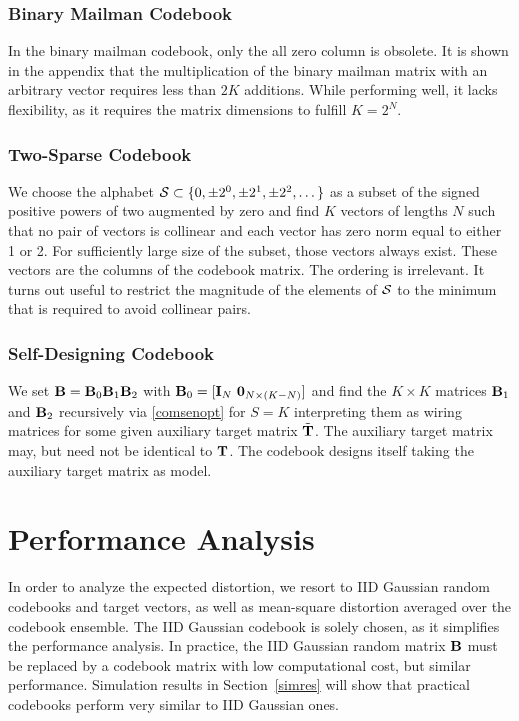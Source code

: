 \documentclass[twocolumn]{IEEEtran}
\begin{document}
\subsubsection{Binary Mailman Codebook}
In the binary mailman codebook, only the all zero column is obsolete. It is shown in the appendix that the multiplication of the binary mailman matrix with an arbitrary vector requires less than $2K$ additions. While performing well, it lacks flexibility, as it requires the matrix dimensions to fulfill $K=2^N$. 

\subsubsection{Two-Sparse Codebook}
We choose the alphabet ${\cal S} \subset \{ 0, \pm 2^0, \pm 2^1, \pm 2^2, \dots \}$ as a subset of the signed positive powers of two augmented by zero and find $K$ vectors of lengths $N$ such that no pair of vectors is collinear and each vector has zero norm equal to either 1 or 2. For sufficiently large size of the subset, those vectors always exist. These vectors are the columns of the codebook matrix. The ordering is irrelevant. It turns out useful to restrict the magnitude of the elements of ${\cal S}$ to the minimum that is required to avoid collinear pairs. 

\subsubsection{Self-Designing Codebook}
We set $\mathbf{B} = \mathbf{B}_0 \mathbf{B}_1 \mathbf{B}_2$ with $\mathbf{B}_0 = [\mathbf I_N \ \mathbf 0_{N\times (K-N)}]$ and find the $K\times K$ matrices $\mathbf{B}_1$ and $\mathbf{B}_2$ recursively via \eqref{comsenopt} for $S=K$ interpreting them as wiring matrices for some given auxiliary target matrix $\tilde{\mathbf{T}}$. The auxiliary target matrix may, but need not be identical to $\mathbf{T}$.
The codebook designs itself taking the auxiliary target matrix as model. 



\section{Performance Analysis}
\label{perana}

In order to analyze the expected distortion, we resort to IID Gaussian random codebooks and target vectors, as well as mean-square distortion averaged over the codebook ensemble.
The IID Gaussian codebook is solely chosen, as it simplifies the performance analysis. In practice, the IID Gaussian random matrix $\mathbf{B}$ must be replaced by a codebook matrix with low computational cost, but similar performance. Simulation results in Section~\ref{simres} will show that practical codebooks perform very similar to IID Gaussian ones.
\end{document}
